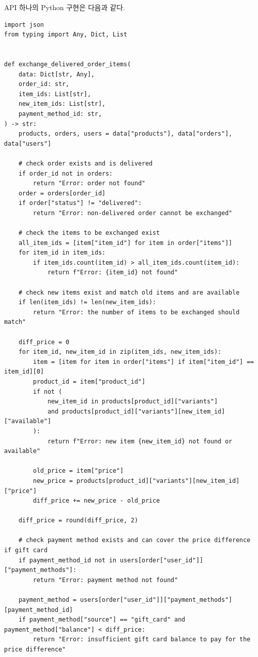 \retail{} API 하나의 Python 구현은 다음과 같다.

\begin{verbatim}
import json
from typing import Any, Dict, List


def exchange_delivered_order_items(
    data: Dict[str, Any],
    order_id: str,
    item_ids: List[str],
    new_item_ids: List[str],
    payment_method_id: str,
) -> str:
    products, orders, users = data["products"], data["orders"], data["users"]

    # check order exists and is delivered
    if order_id not in orders:
        return "Error: order not found"
    order = orders[order_id]
    if order["status"] != "delivered":
        return "Error: non-delivered order cannot be exchanged"

    # check the items to be exchanged exist
    all_item_ids = [item["item_id"] for item in order["items"]]
    for item_id in item_ids:
        if item_ids.count(item_id) > all_item_ids.count(item_id):
            return f"Error: {item_id} not found"

    # check new items exist and match old items and are available
    if len(item_ids) != len(new_item_ids):
        return "Error: the number of items to be exchanged should match"

    diff_price = 0
    for item_id, new_item_id in zip(item_ids, new_item_ids):
        item = [item for item in order["items"] if item["item_id"] == item_id][0]
        product_id = item["product_id"]
        if not (
            new_item_id in products[product_id]["variants"]
            and products[product_id]["variants"][new_item_id]["available"]
        ):
            return f"Error: new item {new_item_id} not found or available"

        old_price = item["price"]
        new_price = products[product_id]["variants"][new_item_id]["price"]
        diff_price += new_price - old_price

    diff_price = round(diff_price, 2)

    # check payment method exists and can cover the price difference if gift card
    if payment_method_id not in users[order["user_id"]]["payment_methods"]:
        return "Error: payment method not found"

    payment_method = users[order["user_id"]]["payment_methods"][payment_method_id]
    if payment_method["source"] == "gift_card" and payment_method["balance"] < diff_price:
        return "Error: insufficient gift card balance to pay for the price difference"


\end{verbatim}
